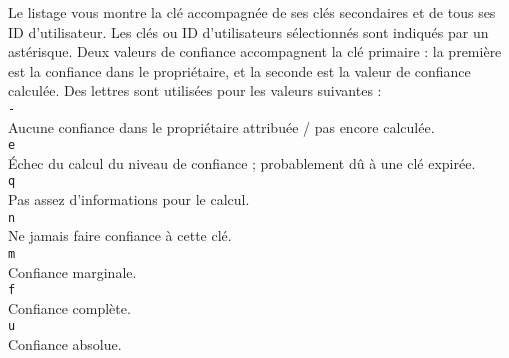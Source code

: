 Le listage vous montre la clé accompagnée de ses clés secondaires et de tous ses ID d'utilisateur. 
Les clés ou ID d'utilisateurs sélectionnés sont indiqués par un astérisque. 
Deux valeurs de confiance accompagnent la clé primaire : la première est la confiance dans le propriétaire, 
et la seconde est la valeur de confiance calculée. Des lettres sont utilisées pour les valeurs suivantes :\\

         \texttt{-}\\ 
            Aucune confiance dans le propriétaire attribuée / pas encore calculée.\\
         \texttt{e}\\ 
            Échec du calcul du niveau de confiance ; probablement dû à une clé expirée.\\
         \texttt{q}\\ 
            Pas assez d'informations pour le calcul.\\
         \texttt{n}\\ 
            Ne jamais faire confiance à cette clé.\\
         \texttt{m}\\ 
            Confiance marginale.\\
         \texttt{f}\\ 
            Confiance complète.\\
         \texttt{u}\\ 
            Confiance absolue.\\

